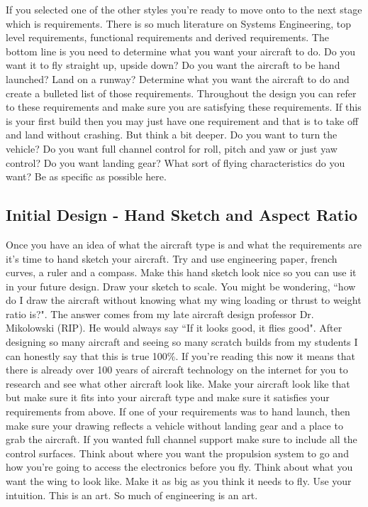 If you selected one of the other styles you're ready to move onto to
the next stage which is requirements. There is so much literature on
Systems Engineering, top level requirements, functional
requirements and derived requirements. The bottom line is you need to
determine what you want your aircraft to do. Do you want it to fly
straight up, upside down? Do you want the aircraft to be hand
launched? Land on a runway? Determine what you want the aircraft to do
and create a bulleted list of those requirements. Throughout the
design you can refer to these requirements and make sure you are
satisfying these requirements. If this is your first build then you
may just have one requirement and that is to take off and land without
crashing. But think a bit deeper. Do you want to turn the vehicle? Do
you want full channel control for roll, pitch and yaw or just yaw
control? Do you want landing gear? What sort of flying characteristics
do you want? Be as specific as possible here. 

\subsection{Initial Design - Hand Sketch and Aspect Ratio}

Once you have an idea of what the aircraft type is and what the
requirements are it's time to hand sketch your aircraft. Try and use
engineering paper, french curves, a ruler and a compass. Make this
hand sketch look nice so you can use it in your future design. Draw
your sketch to scale. You might be wondering, ``how do I draw the
aircraft without knowing what my wing loading or thrust to weight
ratio is?". The answer comes from my late aircraft design professor
Dr. Mikolowski (RIP). He would always say ``If it looks good, it flies
good". After designing so many aircraft and seeing so many scratch
builds from my students I can honestly say that this is true
100\%. If you're reading this now it means that there is already over
100 years of aircraft technology on the internet for you to research
and see what other aircraft look like. Make your aircraft look like
that but make sure it fits into your aircraft type and make sure it
satisfies your requirements from above. If one of your requirements
was to hand launch, then make sure your drawing reflects a vehicle
without landing gear and a place to grab the aircraft. If you wanted
full channel support make sure to include all the control
surfaces. Think about where you want the propulsion system to go and
how you're going to access the electronics before you fly. Think about
what you want the wing to look like. Make it as big as you think it
needs to fly. Use your intuition. This is an art. So much of
engineering is an art.

